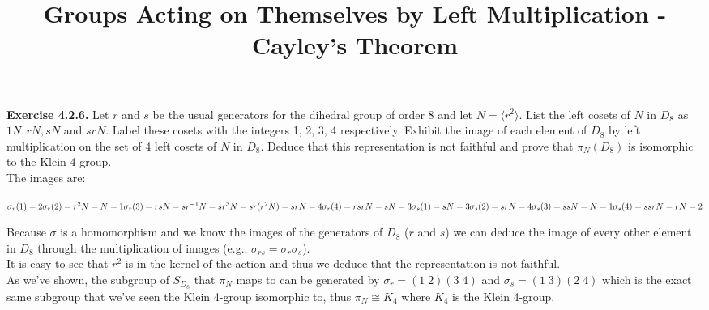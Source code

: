 \documentclass{article}
\title{\textbf{Groups Acting on Themselves by Left Multiplication - Cayley's Theorem}}
\begin{document}
	\maketitle
	\textbf{Exercise 4.2.6.} Let $r$ and $s$ be the usual generators for the dihedral group of order 8 and let $N = \langle r^2 \rangle$. List the left cosets of $N$ in $D_8$ as $1N, rN, sN$ and $srN$. Label these cosets with the integers 1, 2, 3, 4 respectively. Exhibit the image of each element of $D_8$ by left multiplication on the set of 4 left cosets of $N$ in $D_8$. Deduce that this representation is not faithful and prove that $\pi_N(D_8)$ is isomorphic to the Klein 4-group. \\
	The images are: 
	\begin{itemize}
		$\sigma_r(1) = 2 \\
		\sigma_r(2) = r^2N = N = 1 \\
		\sigma_r(3) = rsN = sr^{-1}N = sr^3N = sr(r^2N) = srN = 4 \\
		\sigma_r(4) = rsrN = sN = 3 \\
		\sigma_s(1) = sN = 3 \\
		\sigma_s(2) = srN = 4 \\
		\sigma_s(3) = ssN = N  = 1 \\
		\sigma_s(4) = ssrN = rN = 2$
	\end{itemize}
	Because $\sigma$ is a homomorphism and we know the images of the generators of $D_8$ ($r$ and $s$) we can deduce the image of every other element in $D_8$ through the multiplication of images (e.g., $\sigma_{rs} = \sigma_r\sigma_s$). \\
	It is easy to see that $r^2$ is in the kernel of the action and thus we deduce that the representation is not faithful. \\
	As we've shown, the subgroup of $S_{D_8}$ that $\pi_N$ maps to can be generated by $\sigma_r = (1\; 2)(3\; 4)$ and $\sigma_s = (1\; 3)(2\; 4)$ which is the exact same subgroup that we've seen the Klein 4-group isomorphic to, thus $\pi_N \cong K_4$ where $K_4$ is the Klein 4-group.
\end{document}
